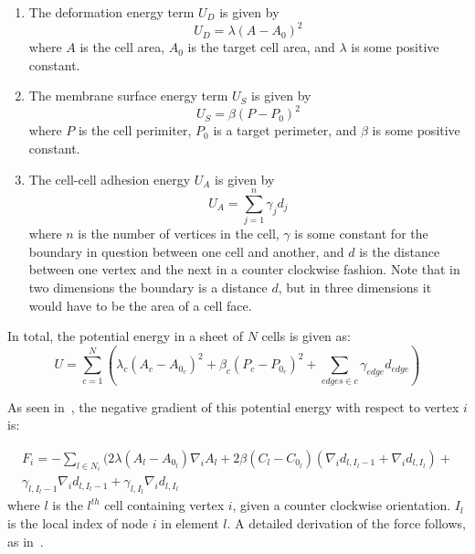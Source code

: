 \begin{enumerate}
\item The deformation energy term $U_D$ is given by \\ 
\begin{equation}
U_D = \lambda(A - A_0)^2
\end{equation}
 where $A$ is the cell area, $A_0$ is the target cell area, and $\lambda$ is some positive constant.
\item The membrane surface energy term $U_S$ is given by
\begin{equation}
U_S = \beta(P - P_0)^2
\end{equation}
 where $P$ is the cell perimiter, $P_0$ is a target perimeter, and $\beta$ is some positive constant.
\item The cell-cell adhesion energy $U_A$ is given by
\begin{equation}U_A = \displaystyle\sum\limits_{j = 1}^{n}\gamma_{j}d_{j}\end{equation}
where $n$ is the number of vertices in the cell, $\gamma$ is some constant for the boundary in question between one cell and another, and $d$ is the distance between one vertex and the next in a counter clockwise fashion. Note that in two dimensions the boundary is a distance $d$, but in three dimensions it would have to be the area of a cell face. 
\end{enumerate}

In total, the potential energy in a sheet of $N$ cells is given as:
\begin{equation*}
U = \sum\limits_{c = 1}^N\left(\lambda_c(A_c - A_{0_c})^2 + \beta_c(P_c - P_{0_c})^2 + \sum_{edges\in c}\gamma_{edge}d_{edge}\right)
\end{equation*}

 As seen in~\cite{ChasteMain}, the negative gradient of this potential energy with respect to vertex $i$ is:

\begin{equation}
\label{eq:force}
\begin{split}
F_i = -\displaystyle\sum_{l\in N_i}(2\lambda(A_l - A_{0_l})\nabla_iA_l + 2\beta(C_l - C_{0_l})(\nabla_i d_{l, I_l-1}+\nabla_i d_{l, I_l}) +\\ \gamma_{l, I_l-1}\nabla_i d_{l, I_l-1} + \gamma_{l, I_l}\nabla_i d_{l, I_l}
\end{split}
\end{equation} 
where $l$ is the $l^{th}$ cell containing vertex $i$, given a counter clockwise orientation. $I_l$ is the local index of node $i$ in element $l$. A detailed derivation of the force follows, as in~\cite{ChasteMain}.

